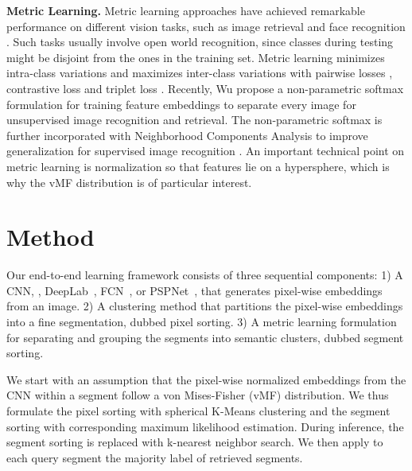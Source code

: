 \documentclass[10pt,twocolumn,letterpaper]{article}
\begin{document}
\noindent \textbf{Metric Learning.}
Metric learning approaches \cite{koestinger2012large,goldberger2005neighbourhood} have achieved remarkable performance on different vision tasks, such as image retrieval \cite{wu2017sampling,wu2018unsupervised,wu2018improving} and face recognition \cite{taigman2014deepface,wang2018cosface,schroff2015facenet}. Such tasks usually involve open world recognition, since classes during testing might be disjoint from the ones in the training set. Metric learning minimizes intra-class variations and maximizes inter-class variations with pairwise losses \eg, contrastive loss \cite{bromley1994signature} and triplet loss \cite{hoffer2015deep}. Recently, Wu \etal \cite{wu2018unsupervised} propose a non-parametric softmax formulation for training feature embeddings to separate every image for unsupervised image recognition and retrieval. The non-parametric softmax is further incorporated with Neighborhood Components Analysis \cite{goldberger2005neighbourhood} to improve generalization for supervised image recognition \cite{wu2018improving}. An important technical point on metric learning is normalization \cite{wang2017normface,schroff2015facenet} so that features lie on a hypersphere, which is why the vMF distribution is of particular interest. 




 
\section{Method}

Our end-to-end learning framework consists of three sequential components:
1) A CNN, \eg,  DeepLab~\cite{deeplabv3plus2018}, FCN~\cite{long2015fully}, or PSPNet~\cite{zhao2016pyramid}, that generates pixel-wise embeddings from an image.
2) A clustering method that partitions the pixel-wise embeddings into a fine segmentation, dubbed pixel sorting.
3) A metric learning formulation for separating and grouping the segments into semantic clusters, dubbed segment sorting.



We start with an assumption that the pixel-wise normalized embeddings from the CNN within a segment follow a von Mises-Fisher (vMF) distribution.
We thus formulate the pixel sorting with spherical K-Means clustering and the segment sorting with corresponding maximum likelihood estimation.
During inference, the segment sorting is replaced with k-nearest neighbor search.
We then apply to each query segment the majority label of retrieved segments.
\end{document}
